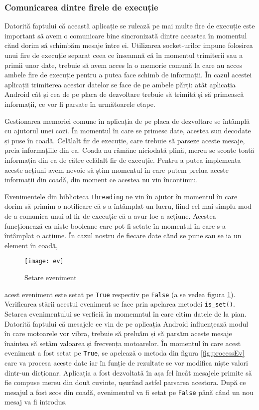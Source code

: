 \documentclass[../IoMusT.tex]{subfiles}
\begin{document}
\subsubsection{Comunicarea dintre firele de execuție} 
Datorită faptului că această aplicație se rulează pe mai multe fire de execuție este important să avem o comunicare bine sincronizată dintre aceastea în momentul cănd dorim să schimbăm mesaje între ei. Utilizarea socket-urilor impune folosirea unui fire de execuție separat ceea ce înseamnă că în momentul trimiterii sau a primii unor date, trebuie să avem acces la o memorie comună la care au acces ambele fire de execuție pentru a putea face schimb de informații. În cazul acestei aplicații trimiterea acestor datelor se face de pe ambele părți: atât aplicația Android cât și cea de pe placa de dezvoltare trebuie să trimită și să primească informații, ce vor fi parsate în următoarele etape.
\\
\par Gestionarea memoriei comune în aplicația de pe placa de dezvoltare se întâmplă cu ajutorul unei cozi. În momentul în care se primesc date, acestea sun decodate și puse în coadă. Celălalt fir de execuție, care trebuie să parseze aceste mesaje, preia informațiile din ea. Coada nu râmăne niciodată plină, mereu se scoate toată informația din ea de către celălalt fir de execuție. Pentru a putea implementa aceste acțiuni avem nevoie să știm momentul în care putem prelua aceste informații din coadă, din moment ce acestea nu vin încontinuu.
\\
\par Evenimentele din biblioteca \verb|threading| ne vin în ajutor în momentul în care dorim să primim o notificare că s-a întâmplat un lucru, fiind cel mai simplu mod de a comunica unui al fir de execuție că a avur loc a acțiune. Acestea funcționează ca niște booleane care pot fi setate în momentul în care s-a întâmplat o acțiune. În cazul nostru de fiecare date cănd se pune sau se ia un element în coadă,
\begin{figure}[h]
\centering
\texttt{[image: ev]}
\caption{Setare eveniment}
\label{fig:ev}
\end{figure}  
 acest eveniment este setat pe \verb|True| respectiv pe \verb|False|  (a se vedea figura \ref{fig:ev}).
 Verificarea stării acestui eveniment se face prin apelarea metodei \verb|is_set()|.
Setarea evenimentului se verficiă în momemntul în care citim datele de la pian. Datorită faptului că mesajele ce vin de pe aplicația Android influențează modul în care motoarele vor vibra, trebuie să preluăm și să parsăm aceste mesaje înaintea să setâm valoarea și frecvența motoarelor. În momentul în care acest eveniment a fost setat pe \verb|True|, se apelează o metoda din figura \ref{fig:processEv} care va procesa aceste date iar în funție de rezultate se vor modifica niște valori dintr-un dicționar. Aplicația a fost dezvoltată în așa fel încât mesajele primite să fie compuse mereu din două cuvinte, ușurând astfel parsarea acestora. După ce mesajul a fost scos din coadă, evenimentul va fi setat pe \verb|False| până când un nou mesaj va fi introdus.
\end{document}
